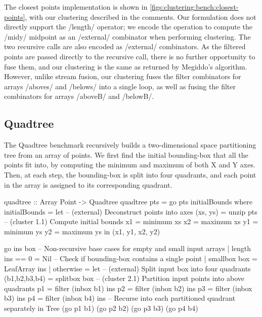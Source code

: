 The closest points implementation is shown in \cref{figs:clustering:bench:closest-points}, with our clustering described in the comments.
Our formulation does not directly support the \Hs/length/ operator; we encode the operation to compute the \Hs/midy/ midpoint as an \Hs/external/ combinator when performing clustering.
The two recursive calls are also encoded as \Hs/external/ combinators.
As the filtered points are passed directly to the recursive call, there is no further opportunity to fuse them, and our clustering is the same as returned by Megiddo's algorithm.
However, unlike stream fusion, our clustering fuses the filter combinators for arrays \Hs/aboves/ and \Hs/belows/ into a single loop, as well as fusing the filter combinators for arrays \Hs/aboveB/ and \Hs/belowB/.


\subsection{Quadtree}
The Quadtree benchmark recursively builds a two-dimensional space partitioning tree from an array of points.
We first find the initial bounding-box that all the points fit into, by computing the minimum and maximum of both X and Y axes.
Then, at each step, the bounding-box is split into four quadrants, and each point in the array is assigned to its corresponding quadrant.

\begin{haskell}[float,caption=Quadtree benchmark,label=figs:clustering:bench:quadtree]
quadtree :: Array Point -> Quadtree
quadtree pts = go pts initialBounds
 where
  initialBounds
   = let -- (external) Deconstruct points into axes
         (xs, ys) = unzip pts
         -- (cluster 1.1) Compute initial bounds
         x1       = minimum xs
         x2       = maximum xs
         y1       = minimum ys
         y2       = maximum ys
     in (x1, y1, x2, y2)

  go ins box
   -- Non-recursive base cases for empty and small input arrays
   | length ins == 0
   = Nil
   -- Check if bounding-box contains a single point
   | smallbox box
   = LeafArray ins
   | otherwise
   = let -- (external) Split input box into four quadrants
         (b1,b2,b3,b4)    = splitbox box
         -- (cluster 2.1) Partition input points into above quadrants
         p1               = filter (inbox b1) ins
         p2               = filter (inbox b2) ins
         p3               = filter (inbox b3) ins
         p4               = filter (inbox b4) ins
         -- Recurse into each partitioned quadrant separately
     in  Tree (go p1 b1) (go p2 b2) (go p3 b3) (go p4 b4)
\end{haskell}

